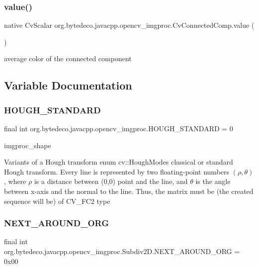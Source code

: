 \subsubsection{\texorpdfstring{value()}{value()}}
{\footnotesize\ttfamily native Cv\+Scalar org.\+bytedeco.\+javacpp.\+opencv\+\_\+imgproc.\+Cv\+Connected\+Comp.\+value (\begin{DoxyParamCaption}{ }\end{DoxyParamCaption})}

average color of the connected component 

\subsection{Variable Documentation}
\mbox{\label{group__imgproc_ga8a1f49c921b5f1321db39c707417054d}} 
\subsubsection{\texorpdfstring{H\+O\+U\+G\+H\+\_\+\+S\+T\+A\+N\+D\+A\+RD}{HOUGH\_STANDARD}}
{\footnotesize\ttfamily final int org.\+bytedeco.\+javacpp.\+opencv\+\_\+imgproc.\+H\+O\+U\+G\+H\+\_\+\+S\+T\+A\+N\+D\+A\+RD = 0\hspace{0.3cm}{\ttfamily [static]}}

imgproc\+\_\+shape 

Variants of a Hough transform enum cv\+::\+Hough\+Modes classical or standard Hough transform. Every line is represented by two floating-\/point numbers $(\rho, \theta)$ , where $\rho$ is a distance between (0,0) point and the line, and $\theta$ is the angle between x-\/axis and the normal to the line. Thus, the matrix must be (the created sequence will be) of C\+V\+\_\+F\+C2 type \mbox{\label{group__imgproc_gaf83cf3be67294a0c15de36941b587526}} 
\subsubsection{\texorpdfstring{N\+E\+X\+T\+\_\+\+A\+R\+O\+U\+N\+D\+\_\+\+O\+RG}{NEXT\_AROUND\_ORG}}
{\footnotesize\ttfamily final int org.\+bytedeco.\+javacpp.\+opencv\+\_\+imgproc.\+Subdiv2\+D.\+N\+E\+X\+T\+\_\+\+A\+R\+O\+U\+N\+D\+\_\+\+O\+RG = 0x00\hspace{0.3cm}{\ttfamily [static]}}

